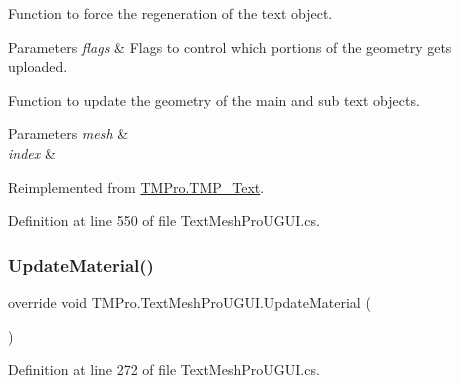 Function to force the regeneration of the text object. 


\begin{DoxyParams}{Parameters}
{\em flags} & Flags to control which portions of the geometry gets uploaded.\\
\hline
\end{DoxyParams}


Function to update the geometry of the main and sub text objects. 


\begin{DoxyParams}{Parameters}
{\em mesh} & \\
\hline
{\em index} & \\
\hline
\end{DoxyParams}


Reimplemented from \mbox{\hyperlink{class_t_m_pro_1_1_t_m_p___text_a555f26eef9b5a5e51d27217c4c8adb8a}{T\+M\+Pro.\+T\+M\+P\+\_\+\+Text}}.



Definition at line 550 of file Text\+Mesh\+Pro\+U\+G\+U\+I.\+cs.

\mbox{\label{class_t_m_pro_1_1_text_mesh_pro_u_g_u_i_ab4ae70c3573369f058130f459a4df34d}} 
\subsubsection{\texorpdfstring{UpdateMaterial()}{UpdateMaterial()}}
{\footnotesize\ttfamily override void T\+M\+Pro.\+Text\+Mesh\+Pro\+U\+G\+U\+I.\+Update\+Material (\begin{DoxyParamCaption}{ }\end{DoxyParamCaption})\hspace{0.3cm}{\ttfamily [protected]}}







Definition at line 272 of file Text\+Mesh\+Pro\+U\+G\+U\+I.\+cs.

\mbox{\label{class_t_m_pro_1_1_text_mesh_pro_u_g_u_i_a7a55d8c0461e66d88ab71cd27bea397f}} 
